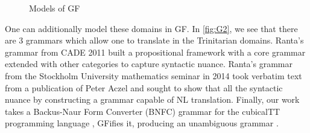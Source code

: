
\begin{figure}[H]
\centering
{}
\caption{Models of GF} \label{fig:G1}
\end{figure}

One can additionally model these domains in GF. In \autoref{fig:G2}, we see that
there are 3 grammars which allow one to translate in the Trinitarian domains. Ranta's
grammar from CADE 2011 \cite{rantaLog} built a propositional framework with a core grammar
extended with other categories to capture syntactic nuance. Ranta's grammar from
the Stockholm University mathematics seminar in 2014 \cite{aarneHott} took verbatim text from a
publication of Peter Aczel and sought to show that all the syntactic nuance by
constructing a grammar capable of NL translation. Finally, our work takes a Backus-Naur
Form Converter (BNFC) \cite{bnfc}
grammar for the cubicalTT programming language \cite{cubicaltt}, GFifies it,
producing an unambiguous grammar \cite{warrickCub}.

